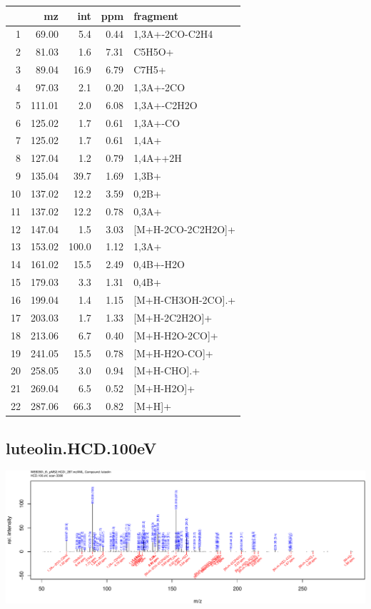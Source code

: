 \documentclass[]{article}
\begin{document}
\begin{table}[ht]
\centering
\begin{tabular}{rrrrl}
  \toprule
 & mz & int & ppm & fragment \\ 
  \midrule
1 & 69.00 & 5.4 & 0.44 & 1,3A+-2CO-C2H4 \\ 
  2 & 81.03 & 1.6 & 7.31 & C5H5O+ \\ 
  3 & 89.04 & 16.9 & 6.79 & C7H5+ \\ 
  4 & 97.03 & 2.1 & 0.20 & 1,3A+-2CO \\ 
  5 & 111.01 & 2.0 & 6.08 & 1,3A+-C2H2O \\ 
  6 & 125.02 & 1.7 & 0.61 & 1,3A+-CO \\ 
  7 & 125.02 & 1.7 & 0.61 & 1,4A+ \\ 
  8 & 127.04 & 1.2 & 0.79 & 1,4A++2H \\ 
  9 & 135.04 & 39.7 & 1.69 & 1,3B+ \\ 
  10 & 137.02 & 12.2 & 3.59 & 0,2B+ \\ 
  11 & 137.02 & 12.2 & 0.78 & 0,3A+ \\ 
  12 & 147.04 & 1.5 & 3.03 & [M+H-2CO-2C2H2O]+ \\ 
  13 & 153.02 & 100.0 & 1.12 & 1,3A+ \\ 
  14 & 161.02 & 15.5 & 2.49 & 0,4B+-H2O \\ 
  15 & 179.03 & 3.3 & 1.31 & 0,4B+ \\ 
  16 & 199.04 & 1.4 & 1.15 & [M+H-CH3OH-2CO].+ \\ 
  17 & 203.03 & 1.7 & 1.33 & [M+H-2C2H2O]+ \\ 
  18 & 213.06 & 6.7 & 0.40 & [M+H-H2O-2CO]+ \\ 
  19 & 241.05 & 15.5 & 0.78 & [M+H-H2O-CO]+ \\ 
  20 & 258.05 & 3.0 & 0.94 & [M+H-CHO].+ \\ 
  21 & 269.04 & 6.5 & 0.52 & [M+H-H2O]+ \\ 
  22 & 287.06 & 66.3 & 0.82 & [M+H]+ \\ 
   \bottomrule
\end{tabular}
\end{table}

\clearpage\subsection{luteolin.HCD.100eV}
\includegraphics[width=\textwidth]{WEB350_files/figure-latex/unnamed-chunk-3-18}
\end{document}
